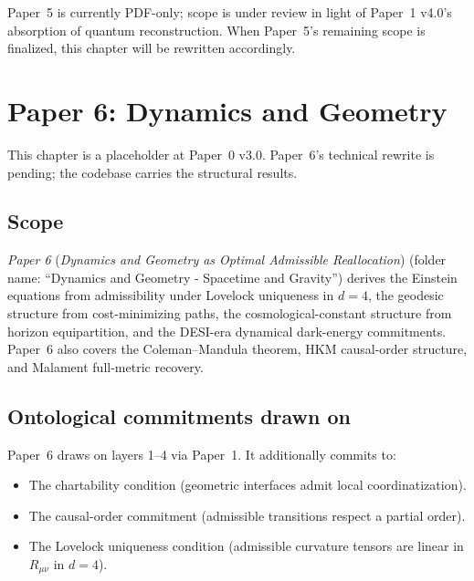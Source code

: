 \documentclass[11pt]{article}
\newcommand{\paperref}[2]{\emph{Paper #1} (\emph{#2})}
\begin{document}
Paper~5 is currently PDF-only; scope is under review in light of Paper~1 v4.0's absorption of quantum reconstruction. When Paper~5's remaining scope is finalized, this chapter will be rewritten accordingly.

\clearpage

\section{Paper 6: Dynamics and Geometry}\label{sec:P6}

\begin{tcolorbox}[pendingbox, title={Status: placeholder chapter}]
This chapter is a placeholder at Paper~0 v3.0. Paper~6's technical rewrite is pending; the codebase carries the structural results.
\end{tcolorbox}

\subsection{Scope}\label{sec:P6_scope}

\paperref{6}{Dynamics and Geometry as Optimal Admissible Reallocation} (folder name: ``Dynamics and Geometry - Spacetime and Gravity'') derives the Einstein equations from admissibility under Lovelock uniqueness in $d=4$, the geodesic structure from cost-minimizing paths, the cosmological-constant structure from horizon equipartition, and the DESI-era dynamical dark-energy commitments. Paper~6 also covers the Coleman--Mandula theorem, HKM causal-order structure, and Malament full-metric recovery.

\subsection{Ontological commitments drawn on}\label{sec:P6_commitments}

Paper~6 draws on layers 1--4 via Paper~1. It additionally commits to:

\begin{itemize}
    \item The chartability condition (geometric interfaces admit local coordinatization).
    \item The causal-order commitment (admissible transitions respect a partial order).
    \item The Lovelock uniqueness condition (admissible curvature tensors are linear in $R_{\mu\nu}$ in $d=4$).
\end{itemize}
\end{document}

